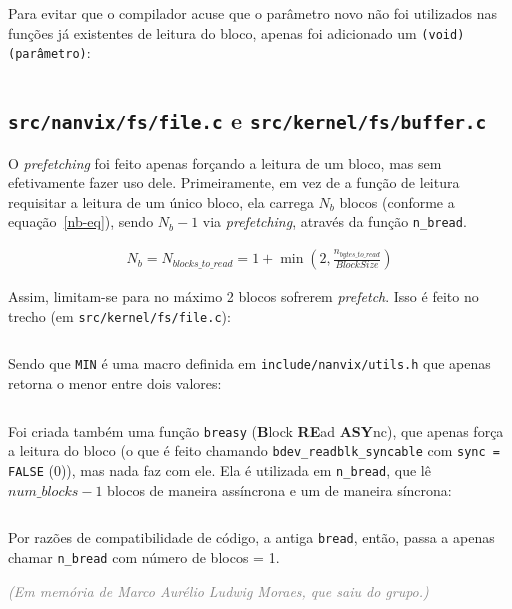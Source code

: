 \documentclass{article}
\begin{document}
Para evitar que o compilador acuse que o parâmetro novo não foi utilizados nas
funções já existentes de leitura do bloco, apenas foi adicionado um
\texttt{(void) (parâmetro)}:

\inputminted[firstline=133, lastline=135]{c}{../../src/kernel/dev/ramdisk/ramdisk.c}

\subsection{\texttt{src/nanvix/fs/file.c} e \texttt{src/kernel/fs/buffer.c}}

O \textit{prefetching} foi feito apenas forçando a leitura de um bloco, mas sem
efetivamente fazer uso dele. Primeiramente, em vez de a função de leitura
requisitar a leitura de um único bloco, ela carrega $N_b$ blocos (conforme a
equação~\ref{nb-eq}), sendo $N_b - 1$ via \textit{prefetching}, através da
função \texttt{n\_bread}.

{\Large
\begin{align}
    N_b = N_{blocks\_to\_read} = 1 + \min(2, \frac{n_{bytes\_to\_read}}{BlockSize})
    \label{nb-eq}
\end{align}
}

Assim, limitam-se para no máximo 2 blocos sofrerem \textit{prefetch}. Isso é
feito no trecho (em \texttt{src/kernel/fs/file.c}):

\inputminted[firstline=305, lastline=305]{c}{../../src/kernel/fs/file.c}

Sendo que \texttt{MIN} é uma macro definida em \texttt{include/nanvix/utils.h}
que apenas retorna o menor entre dois valores:

\inputminted{c}{../../include/nanvix/utils.h}

Foi criada também uma função \texttt{breasy} (\textbf{B}lock \textbf{RE}ad
\textbf{ASY}nc), que apenas força a leitura do bloco (o que é feito chamando
\texttt{bdev\_readblk\_syncable} com \texttt{sync = FALSE} (0)), mas nada faz
com ele. Ela é utilizada em \texttt{n\_bread}, que lê \texttt{$num\_blocks -
1$} blocos de maneira assíncrona e um de maneira síncrona:

\inputminted[firstline=574, lastline=577]{c}{../../src/kernel/fs/buffer.c}

Por razões de compatibilidade de código, a antiga \texttt{bread}, então, passa
a apenas chamar \texttt{n\_bread} com número de blocos = 1.

\vspace*{\fill}
\textcolor{gray}{%
    \textit{\tiny (Em memória de Marco Aurélio Ludwig Moraes, que saiu do
    grupo.)}}
\end{document}

